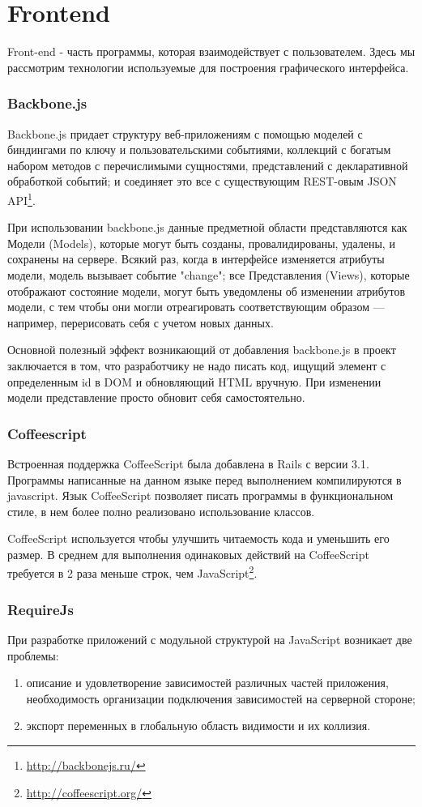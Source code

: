 \section{Frontend}
Front-end - часть программы, которая взаимодействует с пользователем. Здесь мы
рассмотрим технологии используемые для построения графического интерфейса.

\subsubsection{Backbone.js}
Backbone.js придает структуру веб-приложениям с помощью моделей с биндингами по
ключу и пользовательскими событиями, коллекций с богатым набором методов с
перечислимыми сущностями, представлений с декларативной обработкой событий; и
соединяет это все с существующим REST-овым JSON API\footnote{
	\url{http://backbonejs.ru/}
}.

При использовании backbone.js данные предметной области представляются как
Модели (Models), которые могут быть созданы, провалидированы, удалены, и
сохранены на сервере. Всякий раз, когда в интерфейсе изменяется атрибуты модели,
модель вызывает событие "change"; все Представления (Views), которые отображают
состояние модели, могут быть уведомлены об изменении атрибутов модели, с тем
чтобы они могли отреагировать соответствующим образом — например, перерисовать
себя с учетом новых данных.

Основной полезный эффект возникающий от добавления backbone.js в проект
заключается в том, что разработчику не надо писать код, ищущий элемент с
определенным id в DOM и обновляющий HTML вручную. При изменении модели
представление просто обновит себя самостоятельно.

\subsubsection{Coffeescript}
Встроенная поддержка CoffeeScript была добавлена в Rails с версии 3.1. Программы
написанные на данном языке перед выполнением компилируются в javascript. Язык
CoffeeScript позволяет писать программы в функциональном стиле, в нем более
полно реализовано использование классов.

CoffeeScript используется чтобы улучшить читаемость кода и уменьшить его размер.
В среднем для выполнения одинаковых действий на CoffeeScript требуется в 2 раза
меньше строк, чем JavaScript\footnote{
	\url{http://coffeescript.org/}
}.

\subsubsection{RequireJs}
При разработке приложений с модульной структурой на JavaScript возникает две
проблемы:
\begin{enumerate}
  \item описание и удовлетворение зависимостей различных частей приложения, необходимость организации подключения зависимостей на серверной стороне;
  \item экспорт переменных в глобальную область видимости и их коллизия. 
\end{enumerate}

